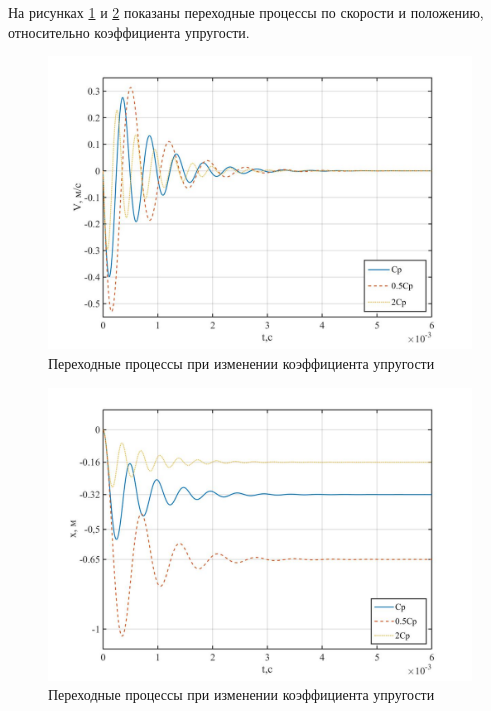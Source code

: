 \documentclass[a4paper, 12pt]{article}
\begin{document}
На рисунках \ref{Cp_V} и \ref{Cp_x} показаны переходные процессы по скорости и положению, относительно коэффициента упругости.

\begin{figure}[h!]
	\centering
	\includegraphics[width = 0.65\textheight]{data/Cp_V}
	\caption{Переходные процессы при изменении коэффициента упругости}
	\label{Cp_V}
\end{figure}

\newpage

\begin{figure}[h!]
	\centering
	\includegraphics[width = 0.65\textheight]{data/Cp_x}
	\caption{Переходные процессы при изменении коэффициента упругости}
	\label{Cp_x}
\end{figure}

\newpage
\end{document}
